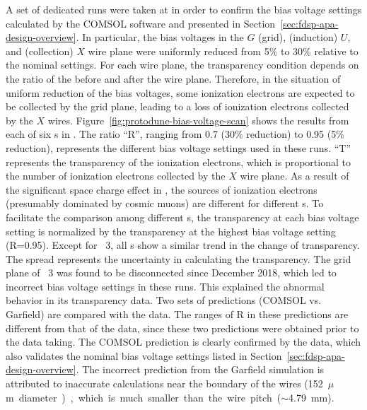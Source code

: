 A set of dedicated runs were taken at  in order to confirm the bias voltage settings calculated by the COMSOL software %
and presented in Section~\ref{sec:fdsp-apa-design-overview}. In particular, the bias voltages in the $G$ (grid), (induction) $U$, and (collection) $X$ wire plane were uniformly reduced from 5\% to 30\% relative to the nominal settings. For each wire plane, the transparency condition depends on the ratio of the \efield before and after the wire plane. Therefore, in the situation of uniform reduction of the bias voltages, some ionization electrons are expected to be collected by the grid plane, leading to a loss of ionization electrons collected by the $X$ wires. Figure~\ref{fig:protodune-bias-voltage-scan} shows the results from each of six s in . The ratio ``R'', ranging from 0.7 (30\% reduction) to 0.95 (5\% reduction), represents the different bias voltage settings used in these runs. ``T'' represents the transparency of the ionization electrons, which is proportional to the number of ionization electrons collected by the $X$ wire plane. As a result of the significant space charge effect in , the sources of ionization electrons (presumably dominated by cosmic muons) are different for different s. To facilitate the comparison among different s, the transparency at each bias voltage setting is normalized by the transparency at the highest bias voltage setting (R=0.95). Except for ~3, all s show a similar trend in the change of transparency. The spread represents the uncertainty in calculating the transparency. The grid plane of ~3 was found to be disconnected since December 2018, which led to incorrect bias voltage settings in these runs. This explained the abnormal behavior in its transparency data. Two sets of predictions (COMSOL vs. Garfield) are compared with the  data. The ranges of R in these predictions are different from that of the  data, since these two predictions were obtained prior to the  data taking. The COMSOL prediction is clearly confirmed by the  data, which also validates the nominal bias voltage settings listed in Section~\ref{sec:fdsp-apa-design-overview}. The incorrect prediction from the Garfield simulation is attributed to inaccurate \efield calculations near the boundary of the wires (\SI{152}{$\mu$m} diameter), which is much smaller than the wire pitch ($\sim$\SI{4.79}{mm}). 

